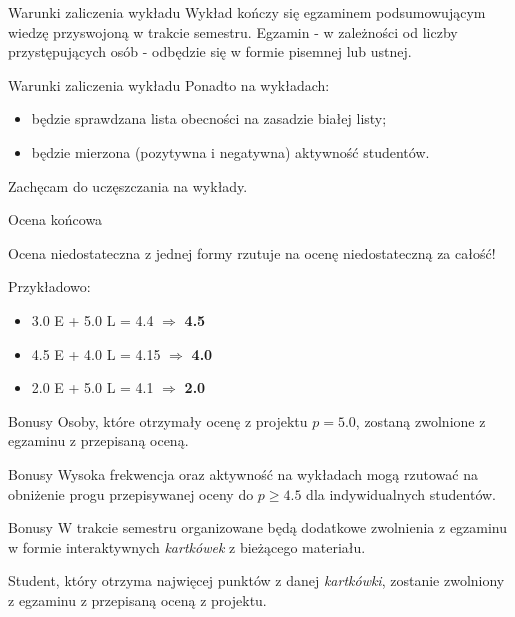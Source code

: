 \begin{frame}{Warunki zaliczenia wykładu}
	Wykład kończy się egzaminem podsumowującym wiedzę przyswojoną w trakcie semestru. Egzamin - w zależności od liczby przystępujących osób - odbędzie się w formie pisemnej lub ustnej.
\end{frame}

\begin{frame}{Warunki zaliczenia wykładu}	
	Ponadto na wykładach:
	\begin{itemize}
		\item będzie sprawdzana lista obecności na zasadzie białej listy;
		\item będzie mierzona (pozytywna i negatywna) aktywność studentów.
	\end{itemize}
	
	Zachęcam do uczęszczania na wykłady.
\end{frame}

\begin{frame}{Ocena końcowa}
	\begin{figure}
	\end{figure}
	
	Ocena niedostateczna z jednej formy rzutuje na ocenę niedostateczną za całość!
	
	Przykładowo:
	\begin{itemize}
		\item 3.0 E + 5.0 L = 4.4 $\Rightarrow$ \textbf{4.5}
		\item 4.5 E + 4.0 L = 4.15 $\Rightarrow$ \textbf{4.0}
		\item 2.0 E + 5.0 L = 4.1 $\Rightarrow$ \textbf{2.0}
	\end{itemize}
\end{frame}

\begin{frame}{Bonusy}	
	Osoby, które otrzymały ocenę z projektu \textbf{$p = 5.0$}, zostaną zwolnione z egzaminu z przepisaną oceną.
\end{frame}

\begin{frame}{Bonusy}	
	Wysoka frekwencja oraz aktywność na wykładach mogą rzutować na obniżenie progu przepisywanej oceny do $p \geq 4.5$ dla indywidualnych studentów.
\end{frame}

\begin{frame}{Bonusy}		
	W trakcie semestru organizowane będą dodatkowe zwolnienia z egzaminu w formie interaktywnych \emph{kartkówek} z bieżącego materiału.
	
	Student, który otrzyma najwięcej punktów z danej \emph{kartkówki}, zostanie zwolniony z egzaminu z przepisaną oceną z projektu.
\end{frame}

